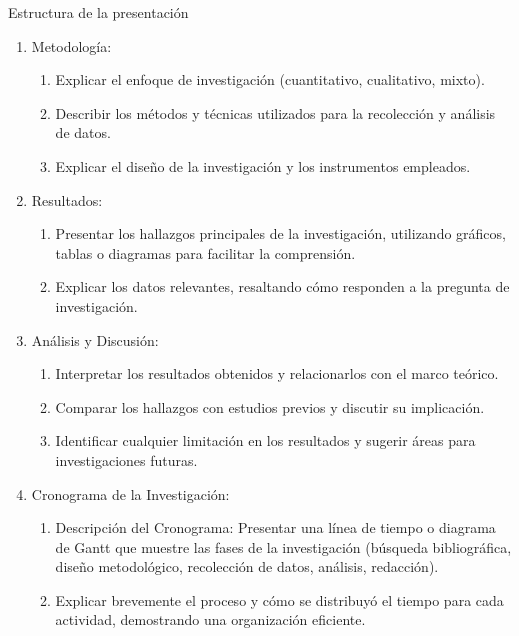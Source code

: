 \documentclass[9pt]{beamer}
\begin{document}
\begin{frame}{Estructura de la presentación}
\begin{enumerate}
    \begin{enumerate}
        \item Breve mención de las teorías, conceptos y estudios previos que sustentan la investigación.
        \item Destacar las bases científicas o teóricas más relevantes para el problema estudiado.
    \end{enumerate}
    \item Metodología:
    \begin{enumerate}
        \item Explicar el enfoque de investigación (cuantitativo, cualitativo, mixto).
        \item Describir los métodos y técnicas utilizados para la recolección y análisis de datos.
        \item Explicar el diseño de la investigación y los instrumentos empleados.
    \end{enumerate}
    \item Resultados:
    \begin{enumerate}
        \item Presentar los hallazgos principales de la investigación, utilizando gráficos, tablas o diagramas para facilitar la comprensión.
        \item Explicar los datos relevantes, resaltando cómo responden a la pregunta de investigación.
    \end{enumerate}
    \item Análisis y Discusión:
    \begin{enumerate}
        \item Interpretar los resultados obtenidos y relacionarlos con el marco teórico.
        \item Comparar los hallazgos con estudios previos y discutir su implicación.
        \item Identificar cualquier limitación en los resultados y sugerir áreas para investigaciones futuras.
    \end{enumerate}
    \item Cronograma de la Investigación:
    \begin{enumerate}
        \item Descripción del Cronograma: Presentar una línea de tiempo o diagrama de Gantt que muestre las fases de la investigación (búsqueda bibliográfica, diseño metodológico, recolección de datos, análisis, redacción).
        \item Explicar brevemente el proceso y cómo se distribuyó el tiempo para cada actividad, demostrando una organización eficiente.

\end{enumerate}
\end{enumerate}
\end{frame}
\end{document}
